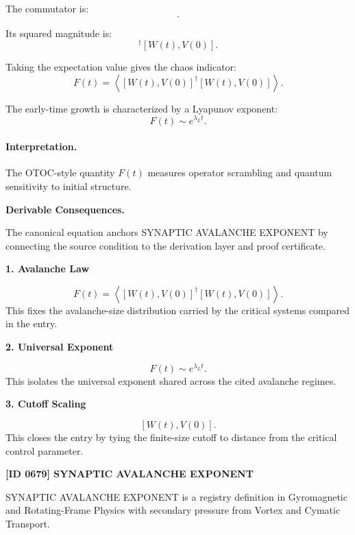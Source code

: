 The commutator is:
\begin{equation}
[W(t),V(0)] .
\end{equation}

Its squared magnitude is:
\begin{equation}
[W(t),V(0)]^\dagger[W(t),V(0)] .
\end{equation}

Taking the expectation value gives the chaos indicator:
\begin{equation}
\boxed{
F(t)
=
\left\langle
[W(t),V(0)]^\dagger
[W(t),V(0)]
\right\rangle .
}
\end{equation}

The early-time growth is characterized by a Lyapunov exponent:
\begin{equation}
F(t)\sim e^{\lambda_L t}.
\end{equation}

\paragraph{Interpretation.}
The OTOC-style quantity $F(t)$ measures operator scrambling and quantum sensitivity to initial structure.

\par\vspace{0.35em}
\noindent\textbf{Derivable Consequences.}\quad
\begingroup
\footnotesize
\raggedright
The canonical equation anchors SYNAPTIC AVALANCHE EXPONENT by connecting the source condition to the derivation layer and proof certificate.
\par\endgroup

\noindent\textbf{1. Avalanche Law}\par
\[
F(t) = \left\langle [W(t),V(0)]^\dagger [W(t),V(0)] \right\rangle.
\]
\noindent This fixes the avalanche-size distribution carried by the critical systems compared in the entry.\par
\noindent\textbf{2. Universal Exponent}\par
\[
F(t)\sim e^{\lambda_L t}.
\]
\noindent This isolates the universal exponent shared across the cited avalanche regimes.\par
\noindent\textbf{3. Cutoff Scaling}\par
\[
[W(t),V(0)].
\]
\noindent This closes the entry by tying the finite-size cutoff to distance from the critical control parameter.\par

\clearpage
\noindent\textbf{[ID 0679] SYNAPTIC AVALANCHE EXPONENT}\par
\vspace{0.35em}
\begingroup\small
{}
SYNAPTIC AVALANCHE EXPONENT is a registry definition in Gyromagnetic and Rotating-Frame Physics with secondary pressure from Vortex and Cymatic Transport.

